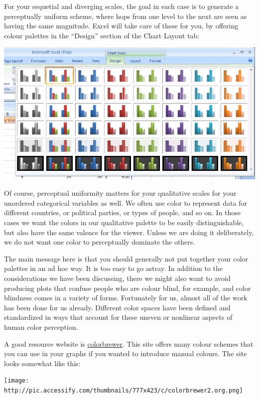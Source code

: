 \documentclass[
]{book}
\begin{document}
For your sequetial and diverging scales, the goal in each case is to generate a perceptually uniform scheme, where hops from one level to the next are seen as having the same magnitude. Excel will take care of these for you, by offering colour palettes in the ``Design'' section of the Chart Layout tab:

\includegraphics{imgs/chart_style.png}

Of course, perceptual uniformity matters for your qualitative scales for your unordered categorical variables as well. We often use color to represent data for different countries, or political parties, or types of people, and so on. In those cases we want the colors in our qualitative palette to be easily distinguishable, but also have the same valence for the viewer. Unless we are doing it deliberately, we do not want one color to perceptually dominate the others.

The main message here is that you should generally not put together your color palettes in an ad hoc way. It is too easy to go astray. In addition to the considerations we have been discussing, there we might also want to avoid producing plots that confuse people who are colour blind, for example, and color blindness comes in a variety of forms. Fortunately for us, almost all of the work has been done for us already. Different color spaces have been defined and standardized in ways that account for these uneven or nonlinear aspects of human color perception.

A good resource website is \href{http://colorbrewer2.org/}{colorbrewer}. This site offers many colour schemes that you can use in your graphs if you wanted to introduce manual colours. The site looks somewhat like this:

\texttt{[image: http://pic.accessify.com/thumbnails/777x423/c/colorbrewer2.org.png]}
\end{document}
